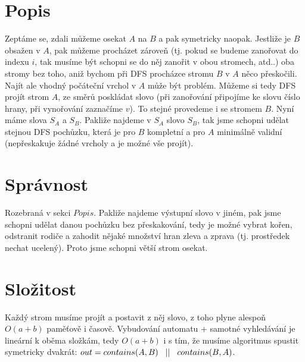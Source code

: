 \documentclass[a4paper]{article}
\begin{document}
\renewcommand{\headrulewidth}{0pt} %
\thispagestyle{fancy} %
{}

\section*{Popis}
Zeptáme se, zdali můžeme osekat $A$ na $B$ a pak symetricky naopak. Jestliže je $B$ obsažen v $A$, pak můžeme procházet zároveň (tj. pokud se budeme zanořovat do indexu $i$, tak musíme být schopni se do něj zanořit v obou stromech, atd..) oba stromy bez toho, aniž bychom při DFS procházce stromu $B$ v $A$ něco přeskočili. Najít ale vhodný počáteční vrchol v $A$ může být problém. Můžeme si tedy DFS projít strom $A$, ze směrů poskládat slovo (při zanořování připojíme ke slovu číslo hrany, při vynořování zaznačíme $v$). To stejné provedeme i se stromem $B$. Nyní máme slova $S_A$ a $S_B$. Pakliže najdeme v $S_A$ slovo $S_B$, tak jsme schopni udělat stejnou DFS pochůzku, která je pro $B$ kompletní a pro $A$ minimálně validní (nepřeskakuje žádné vrcholy a je možné vše projít).

\section*{Správnost}
Rozebraná v sekci $\textit{Popis}$. Pakliže najdeme výstupní slovo v jiném, pak jsme schopni udělat danou pochůzku bez přeskakování, tedy je možné vybrat kořen, odstranit rodiče a zahodit nějaké množství hran zleva a zprava (tj. prostředek nechat ucelený). Proto jsme schopni větší strom osekat.

\section*{Složitost}
Každý strom musíme projít a postavit z něj slovo, z toho plyne alespoň $O(a+b)$ paměťově i časově. Vybudování automatu + samotné vyhledávání je lineární k oběma složkám, tedy $O(a+b)$ i s tím, že musíme algoritmus spustit symetricky dvakrát: $out = contains(A,B)\hspace{0.3cm}||\hspace{0.3cm}contains(B,A)$. 
\end{document}
